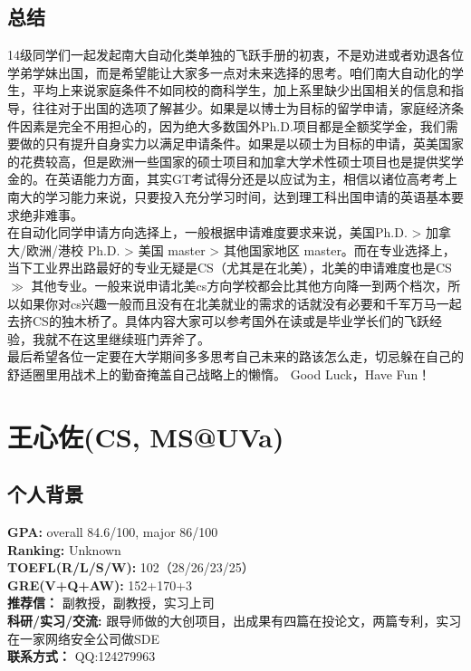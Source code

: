 \documentclass[a4paper,UTF8]{book}
\begin{document}
    \subsection*{总结}
    14级同学们一起发起南大自动化类单独的飞跃手册的初衷，不是劝进或者劝退各位学弟学妹出国，而是希望能让大家多一点对未来选择的思考。咱们南大自动化的学生，平均上来说家庭条件不如同校的商科学生，加上系里缺少出国相关的信息和指导，往往对于出国的选项了解甚少。如果是以博士为目标的留学申请，家庭经济条件因素是完全不用担心的，因为绝大多数国外Ph.D.项目都是全额奖学金，我们需要做的只有提升自身实力以满足申请条件。如果是以硕士为目标的申请，英美国家的花费较高，但是欧洲一些国家的硕士项目和加拿大学术性硕士项目也是提供奖学金的。在英语能力方面，其实GT考试得分还是以应试为主，相信以诸位高考考上南大的学习能力来说，只要投入充分学习时间，达到理工科出国申请的英语基本要求绝非难事。\\
    在自动化同学申请方向选择上，一般根据申请难度要求来说，美国Ph.D. > 加拿大/欧洲/港校 Ph.D. > 美国 master > 其他国家地区 master。而在专业选择上，当下工业界出路最好的专业无疑是CS（尤其是在北美），北美的申请难度也是CS $\gg$ 其他专业。一般来说申请北美cs方向学校都会比其他方向降一到两个档次，所以如果你对cs兴趣一般而且没有在北美就业的需求的话就没有必要和千军万马一起去挤CS的独木桥了。具体内容大家可以参考国外在读或是毕业学长们的飞跃经验，我就不在这里继续班门弄斧了。\\
    最后希望各位一定要在大学期间多多思考自己未来的路该怎么走，切忌躲在自己的舒适圈里用战术上的勤奋掩盖自己战略上的懒惰。
    Good Luck，Have Fun！
    

\clearpage
\section{王心佐(CS, MS@UVa)}
    \subsection*{个人背景}
        \textbf{GPA:} overall 84.6/100, major 86/100\\
        \textbf{Ranking:} Unknown\\
        \textbf{TOEFL(R/L/S/W):} 102（28/26/23/25）\\
        \textbf{GRE(V+Q+AW):} 152+170+3\\
        \textbf{推荐信：} 副教授，副教授，实习上司\\
        \textbf{科研/实习/交流:} 跟导师做的大创项目，出成果有四篇在投论文，两篇专利，实习在一家网络安全公司做SDE\\ 
        \textbf{联系方式：} QQ:124279963
\end{document}
